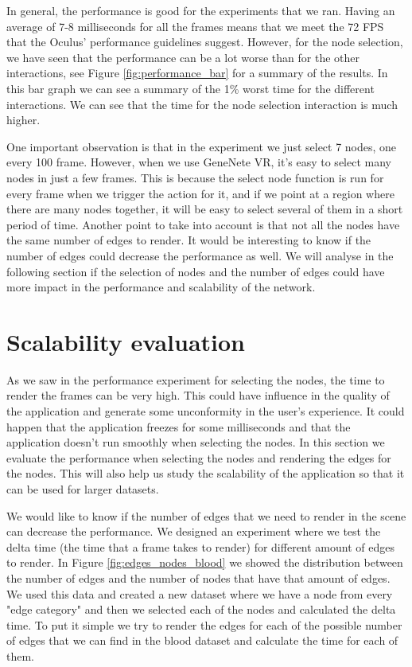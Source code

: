 In general, the performance is good for the experiments that we ran. Having an average of 7-8 milliseconds for all the frames means that we meet the 72 FPS that the Oculus' performance guidelines suggest. However, for the node selection, we have seen that the performance can be a lot worse than for the other interactions, see Figure \ref{fig:performance_bar} for a summary of the results. In this bar graph we can see a summary of the 1\% worst time for the different interactions. We can see that the time for the node selection interaction is much higher.

One important observation is that in the experiment we just select 7 nodes, one every 100 frame. However, when we use GeneNete VR, it's easy to select many nodes in just a few frames. This is because the select node function is run for every frame when we trigger the action for it, and if we point at a region where there are many nodes together, it will be easy to select several of them in a short period of time. Another point to take into account is that not all the nodes have the same number of edges to render. It would be interesting to know if the number of edges could decrease the performance as well. We will analyse in the following section if the selection of nodes and the number of edges could have more impact in the performance and scalability of the network.

\section{Scalability evaluation}
As we saw in the performance experiment for selecting the nodes, the time to render the frames can be very high. This could have influence in the quality of the application and generate some unconformity in the user's experience. It could happen that the application freezes for some milliseconds and that the application doesn't run smoothly when selecting the nodes. In this section we evaluate the performance when selecting the nodes and rendering the edges for the nodes. This will also help us study the scalability of the application so that it can be used for larger datasets.

We would like to know if the number of edges that we need to render in the scene can decrease the performance. We designed an experiment where we test the delta time (the time that a frame takes to render) for different amount of edges to render. In Figure \ref{fig:edges_nodes_blood} we showed the distribution between the number of edges and the number of nodes that have that amount of edges. We used this data and created a new dataset where we have a node from every "edge category" and then we selected each of the nodes and calculated the delta time. To put it simple we try to render the edges for each of the possible number of edges that we can find in the blood dataset and calculate the time for each of them.

